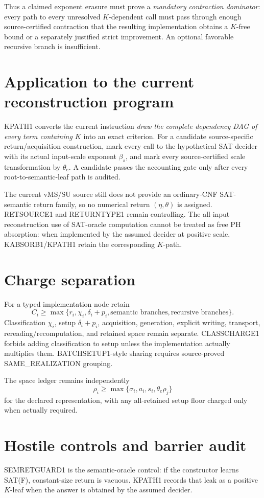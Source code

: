 \documentclass[11pt]{article}
\begin{document}
Thus a claimed exponent erasure must prove a \emph{mandatory contraction dominator}: every path to every unresolved \(K\)-dependent call must pass through enough source-certified contraction that the resulting implementation obtains a \(K\)-free bound or a separately justified strict improvement. An optional favorable recursive branch is insufficient.

\section*{Application to the current reconstruction program}
KPATH1 converts the current instruction \emph{draw the complete dependency DAG of every term containing \(K\)} into an exact criterion. For a candidate source-specific return/acquisition construction, mark every call to the hypothetical SAT decider with its actual input-scale exponent \(\beta_s\), and mark every source-certified scale transformation by \(\theta_e\). A candidate passes the accounting gate only after every root-to-semantic-leaf path is audited.

The current vMS/SU source still does not provide an ordinary-CNF SAT-semantic return family, so no numerical return \((\eta,\theta)\) is assigned. RETSOURCE1 and RETURNTYPE1 remain controlling. The all-input reconstruction use of SAT-oracle computation cannot be treated as free PH absorption: when implemented by the assumed decider at positive scale, KABSORB1/KPATH1 retain the corresponding \(K\)-path.

\section*{Charge separation}
For a typed implementation node retain
\[
C_i\ge\max\{r_i,\chi_i,\delta_i+p_i,\text{semantic branches},\text{recursive branches}\}.
\]
Classification \(\chi_i\), setup \(\delta_i+p_i\), acquisition, generation, explicit writing, transport, rereading/recomputation, and retained space remain separate. CLASSCHARGE1 forbids adding classification to setup unless the implementation actually multiplies them. BATCHSETUP1-style sharing requires source-proved SAME\_REALIZATION grouping.

The space ledger remains independently
\[
\rho_i\ge\max\{\sigma_i,a_i,s_i,\theta_e\rho_j\}
\]
for the declared representation, with any all-retained setup floor charged only when actually required.

\section*{Hostile controls and barrier audit}
SEMRETGUARD1 is the semantic-oracle control: if the constructor learns SAT(F), constant-size return is vacuous. KPATH1 records that leak as a positive \(K\)-leaf when the answer is obtained by the assumed decider.
\end{document}
